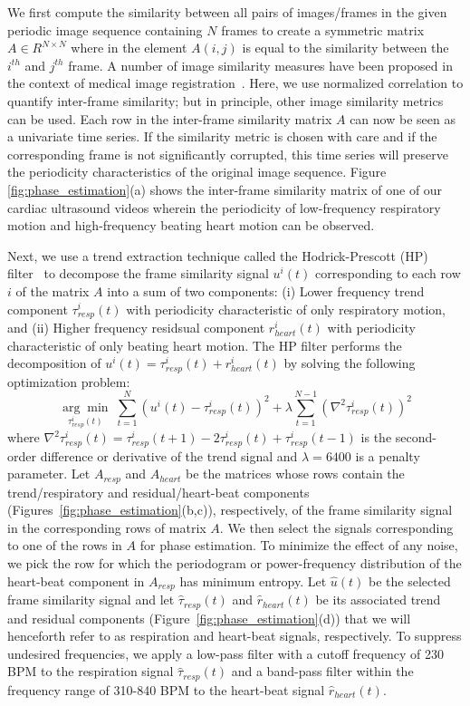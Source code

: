 \documentclass[journal]{IEEEtran}
\newcommand{\argmin}[1]{\underset{#1}{\operatorname{arg}\operatorname{min}}\;}
\begin{document}
	We first compute the similarity between all pairs of images/frames in the given periodic image sequence containing $N$ frames to create a symmetric matrix $A \in R^{N \times N}$ where in the element $A(i,j)$ is equal to the similarity between the $i^{th}$ and $j^{th}$ frame. A number of image similarity measures have been proposed in the context of medical image registration~\cite{Yoo2004}.
Here, we use normalized correlation to quantify inter-frame similarity; but in principle, other image similarity metrics can be used. Each row in the inter-frame similarity matrix $A$ can now be seen as a univariate time series. If the similarity metric is chosen with care and if the corresponding frame is not significantly corrupted, this time series will preserve the periodicity characteristics of the original image sequence. Figure \ref{fig:phase_estimation}(a) shows the inter-frame similarity matrix of one of our cardiac ultrasound videos wherein the periodicity of low-frequency respiratory motion and high-frequency beating heart motion can be observed. 

	Next, we use a trend extraction technique called the Hodrick-Prescott (HP) filter~\cite{Alexandrov2012} to decompose the frame similarity signal $u^i(t)$ corresponding to each row $i$ of the matrix $A$ into a sum of two components: (i) Lower frequency trend component $\tau^i_{resp}(t)$ with periodicity characteristic of only respiratory motion, and (ii) Higher frequency residsual component $r^i_{heart}(t)$ with periodicity characteristic of only beating heart motion. The HP filter performs the decomposition of $u^i(t) = \tau^i_{resp}(t) + r^i_{heart}(t)$ by solving the following optimization problem:
\begin{equation}	
\argmin{\tau^i_{resp}(t)} \sum_{t=1}^{N}  \left(u^i(t) - \tau^i_{resp}(t) \right)^2  + \lambda \sum_{t=1}^{N-1} \left( \nabla^2 \tau^i_{resp}(t) \right)^2
\end{equation}
where $\nabla^2\tau^i_{resp}(t) = \tau^i_{resp}(t+1) - 2 \tau^i_{resp}(t) + \tau^i_{resp}(t-1)$ is the second-order difference or derivative of the trend signal and $\lambda=6400$ is a penalty parameter. Let $A_{resp}$ and $A_{heart}$ be the matrices whose rows contain the trend/respiratory and residual/heart-beat components (Figures~\ref{fig:phase_estimation}(b,c)), respectively, of the frame similarity signal in the corresponding rows of matrix $A$. We then select the signals corresponding to one of the rows in $A$ for phase estimation. To minimize the effect of any noise, we pick the row for which the periodogram or power-frequency distribution of the heart-beat component in $A_{resp}$ has minimum entropy. Let $\hat{u}(t)$ be the selected frame similarity signal and let $\hat{\tau}_{resp}(t)$ and $\hat{r}_{heart}(t)$  be its associated trend and residual components  (Figure~\ref{fig:phase_estimation}(d)) that we will henceforth refer to as respiration and heart-beat signals, respectively. To suppress undesired frequencies, we apply a low-pass filter with a cutoff frequency of 230 BPM to the respiration signal $\hat{\tau}_{resp}(t)$ and a band-pass filter within the frequency range of 310-840 BPM to the heart-beat signal $\hat{r}_{heart}(t)$.
\end{document}
